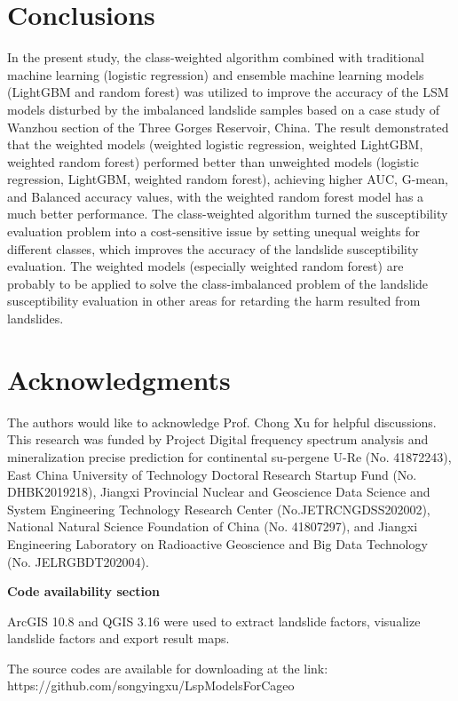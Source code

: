 \documentclass[a4paper,fleqn]{cas-sc}
\begin{document}
\section{Conclusions}

In the present study, the class-weighted algorithm combined with traditional machine learning (logistic regression) and ensemble machine learning models (LightGBM and random forest) was utilized to improve the accuracy of the LSM models disturbed by the imbalanced landslide samples based on a case study of Wanzhou section of the Three Gorges Reservoir, China. The result demonstrated that the weighted models (weighted logistic regression, weighted LightGBM, weighted random forest) performed better than unweighted models (logistic regression, LightGBM, weighted random forest), achieving higher AUC, G-mean, and Balanced accuracy values, with the weighted random forest model has a much better performance. The class-weighted algorithm turned the susceptibility evaluation problem into a cost-sensitive issue by setting unequal weights for different classes, which improves the accuracy of the landslide susceptibility evaluation. The weighted models (especially weighted random forest) are probably to be applied to solve the class-imbalanced problem of the landslide susceptibility evaluation in other areas for retarding the harm resulted from landslides. 

\section{Acknowledgments}

The authors would like to acknowledge Prof. Chong Xu for helpful discussions. 
This research was funded by Project Digital frequency spectrum analysis and mineralization precise prediction for continental su-pergene U-Re (No. 41872243), East China University of Technology Doctoral Research Startup Fund (No. DHBK2019218), Jiangxi Provincial Nuclear and Geoscience Data Science and System Engineering Technology Research Center (No.JETRCNGDSS202002), National Natural Science Foundation of China (No. 41807297), and Jiangxi Engineering Laboratory on Radioactive Geoscience and Big Data Technology (No. JELRGBDT202004).

\newpage

\textbf{Code availability section}

ArcGIS 10.8 and QGIS 3.16 were used to extract landslide factors, visualize landslide factors and export result maps.

The source codes are available for downloading at the link:
https://github.com/songyingxu/LspModelsForCageo



 
\end{document}
